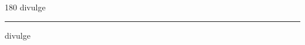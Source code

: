 
\begin{frame}
\begin{center}
\begin{turn}{180}
{\fontsize{2.5cm}{1em}\selectfont divulge}
\end{turn}
\vspace{1em}\par  
\hrule
\vspace{1em}\par  
{\fontsize{2.5cm}{1em}\selectfont divulge}
\end{center}
\end{frame}

